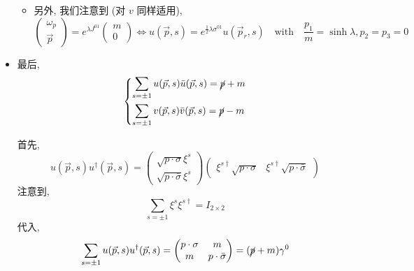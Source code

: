 \begin{itemize}
\begin{itemize}
		\item 另外, 我们注意到 (对 $v$ 同样适用),
		\begin{equation}
			\begin{pmatrix}
				\omega_p \\
				\vec{p}
			\end{pmatrix} = e^{\lambda J^{0 1}} \begin{pmatrix}
				m \\
				0
			\end{pmatrix} \iff u(\vec{p}, s) = e^{\frac{1}{2} \lambda \sigma^{0 1}} u(\vec{p}_r, s) \quad \text{with} \quad \frac{p_1}{m} = \sinh \lambda, p_2 = p_3 = 0
		\end{equation}
	\end{itemize}
	
	\item 最后,
	\begin{equation}
		\begin{dcases}
			\sum_{s = \pm 1} u(\vec{p}, s) \bar{u}(\vec{p}, s) = \cancel{p} + m \\
			\sum_{s = \pm 1} v(\vec{p}, s) \bar{v}(\vec{p}, s) = \cancel{p} - m
		\end{dcases}
	\end{equation}
	
	\begin{tcolorbox}[title=calculation:]
		首先,
		\begin{equation}
			u(\vec{p}, s) u^\dag(\vec{p}, s) = \begin{pmatrix}
				\sqrt{p \cdot \sigma} \xi^s \\
				\sqrt{p \cdot \bar{\sigma}} \xi^s
			\end{pmatrix} \begin{pmatrix}
				\xi^{s \dag} \sqrt{p \cdot \sigma} & \xi^{s \dag} \sqrt{p \cdot \bar{\sigma}}
			\end{pmatrix}
		\end{equation}
		注意到,
		\begin{equation}
			\sum_{s = \pm 1} \xi^{s} \xi^{s \dag} = I_{2 \times 2}
		\end{equation}
		代入,
		\begin{equation}
			\sum_{s = \pm 1} u(\vec{p}, s) u^\dag(\vec{p}, s) = \begin{pmatrix}
				p \cdot \sigma & m \\
				m & p \cdot \bar{\sigma}
			\end{pmatrix} = (\cancel{p} + m) \gamma^0
		\end{equation}
		

\end{tcolorbox}
\end{itemize}
